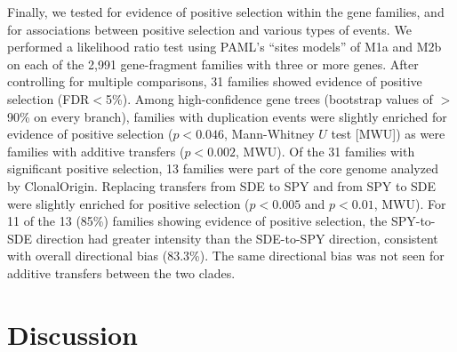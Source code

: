\documentclass[12pt]{article}
\begin{document}

Finally, we tested for evidence of positive selection within the gene
families, and for associations between positive selection and various types
of events.  We performed a likelihood ratio test using PAML's ``sites
models'' of M1a and M2b \citep{Yang2007}
on each of the 2,991 gene-fragment families with three or more genes.
After controlling for multiple comparisons, 31
families showed evidence of positive selection (FDR$<$5\%).  Among
high-confidence gene trees (bootstrap values of $>$90\% on every branch),
families with duplication events were slightly enriched for evidence of
positive selection ($p<0.046$, Mann-Whitney $U$ test [MWU]) as were families
with additive transfers ($p<0.002$, MWU).  Of the 31 families with
significant positive selection, 13 families were part of the core genome
analyzed by ClonalOrigin.  Replacing transfers from SDE to SPY and from SPY
to SDE were slightly enriched for positive selection ($p<0.005$ and
$p<0.01$, MWU).  For 11 of the 13 (85\%) families showing evidence of
positive selection, the SPY-to-SDE direction had greater intensity than the
SDE-to-SPY direction, consistent with overall directional bias (83.3\%).
The same directional bias was not seen for additive transfers between the
two clades.



\section*{Discussion}
\end{document}
